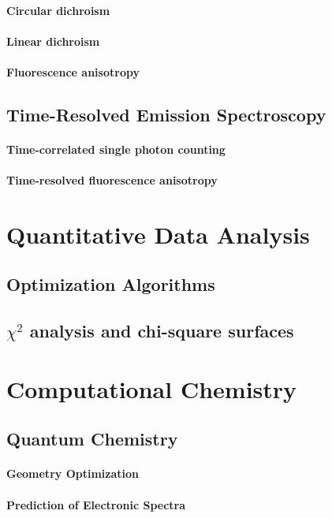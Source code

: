 \paragraph{Circular dichroism}
\paragraph{Linear dichroism}
\paragraph{Fluorescence anisotropy}

\subsection{Time-Resolved Emission Spectroscopy}
\paragraph{Time-correlated single photon counting}
\paragraph{Time-resolved fluorescence anisotropy}

\section{Quantitative Data Analysis}
\subsection{Optimization Algorithms}
\subsection{$\chi^2$ analysis and chi-square surfaces}

\section{Computational Chemistry}
\subsection{Quantum Chemistry}
\paragraph{Geometry Optimization}
\paragraph{Prediction of Electronic Spectra}


